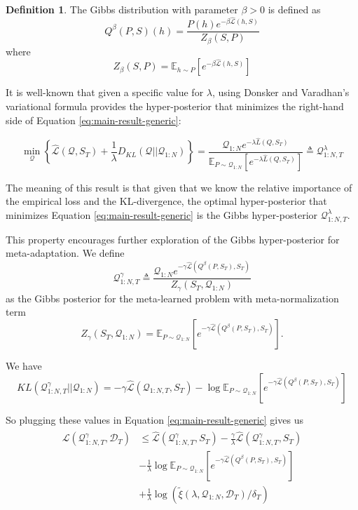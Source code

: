 \documentclass{article}
\theoremstyle{definition}
\newtheorem{defn}{Definition}[section]
\newcommand{\Expect}[2]{\mathbb{E}_{#1}\left [#2 \right ]}
\begin{document}
\begin{defn} \label{defn:Gibbs}
	The Gibbs distribution with parameter $\beta>0$ is defined as $$Q^\beta(P,S)(h)=\frac{P(h)e^{-\beta \hat{\mathcal{L}}(h,S)}}{Z_\beta(S,P)}$$ 
	where 
	$$Z_\beta(S,P)=\Expect{h\sim P}{e^{-\beta\hat{\mathcal{L}}(h,S)}}$$
\end{defn}

It is well-known \citep{Catoni2004} that given a specific value for $\lambda$, using Donsker and Varadhan’s variational formula \citep{Donsker1975} provides the hyper-posterior that minimizes the right-hand side of Equation \ref{eq:main-result-generic}:

$$\min_{\mathcal{Q}} \left\{ \hat{\mathcal{L}}(\mathcal{Q}, S_T) + \frac{1}{\lambda}D_{KL}(\mathcal{Q}||\mathcal{Q}_{1:N}) \right\} = \frac{\mathcal{Q}_{1:N}e^{-\lambda\hat{L}(Q,S_T)}}{\Expect{P\sim \mathcal{Q}_{1:N}}{e^{-\lambda\hat{L}(Q,S_T)}}}\triangleq \mathcal{Q}^{\lambda}_{1:N,T}$$

The meaning of this result is that given that we know the relative importance of the empirical loss and the KL-divergence, the optimal hyper-posterior that minimizes Equation \ref{eq:main-result-generic} is the Gibbs hyper-posterior $\mathcal{Q}^{\lambda}_{1:N,T}$.

This property encourages further exploration of the Gibbs hyper-posterior for meta-adaptation. We define 
\begin{equation} \label{eq:aml-post-defn}
\mathcal{Q}^{\gamma}_{1:N,T}\triangleq \frac{\mathcal{Q}_{1:N}e^{-\gamma\hat{\mathcal{L}}(Q^\beta(P,S_T),S_T)}}{Z_\gamma(S_T, \mathcal{Q}_{1:N})}
\end{equation} 
as the Gibbs posterior for the meta-learned problem with meta-normalization term $$Z_\gamma(S_T, \mathcal{Q}_{1:N})=\Expect{P\sim \mathcal{Q}_{1:N}}{e^{-\gamma\hat{\mathcal{L}}(Q^\beta(P,S_T),S_T)}}.$$

We have 
$$KL(\mathcal{Q}^{\gamma}_{1:N,T}||\mathcal{Q}_{1:N})=
-\gamma\hat{\mathcal{L}}(\mathcal{Q}_{1:N,T}, S_T)-\log\Expect{P\sim \mathcal{Q}_{1:N}}{e^{-\gamma\hat{\mathcal{L}}(Q^\beta(P,S_T),S_T)}}$$ 

So plugging these values in Equation \ref{eq:main-result-generic} gives us
\begin{align*} 
\begin{split}
\mathcal{L}(\mathcal{Q}^{\gamma}_{1:N,T}, \mathcal{D}_T) & \leq \hat{\mathcal{L}}(\mathcal{Q}^{\gamma}_{1:N,T}, S_T) -\frac{\gamma}{\lambda}\hat{\mathcal{L}}(\mathcal{Q}^{\gamma}_{1:N,T}, S_T) \\ &- \frac{1}{\lambda}\log\Expect{P\sim \mathcal{Q}_{1:N}}{e^{-\gamma\hat{\mathcal{L}}(Q^\beta(P,S_T),S_T)}}\\ &+\frac{1}{\lambda}\log\left (\tilde{\xi}(\lambda,\mathcal{Q}_{1:N},\mathcal{D}_T)/\delta_T\right )
\end{split}
\end{align*}
\end{document}
